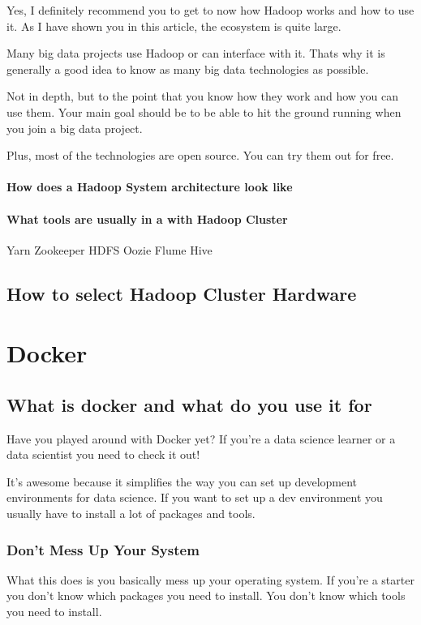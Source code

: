 \documentclass[12pt, numbers=noenddot]{scrreprt} %
\begin{document}
Yes, I definitely recommend you to get to now how Hadoop works and how to use it. As I have shown you in this article, the ecosystem is quite large.

Many big data projects use Hadoop or can interface with it. Thats why it is generally a good idea to know as many big data technologies as possible.

Not in depth, but to the point that you know how they work and how you can use them. Your main goal should be to be able to hit the ground running when you join a big data project.

Plus, most of the technologies are open source. You can try them out for free.
\subsubsection{How does a Hadoop System architecture look like}
\subsubsection{What tools are usually in a with Hadoop Cluster}
Yarn
Zookeeper
HDFS
Oozie
Flume
Hive
\section{How to select Hadoop Cluster Hardware}


\chapter{Docker}

\section{What is docker and what do you use it for}
Have you played around with Docker yet? If you’re a data science learner or a data scientist you need to check it out!

It’s awesome because it simplifies the way you can set up development environments for data science. If you want to set up a dev environment you usually have to install a lot of packages and tools.

\subsection{Don’t Mess Up Your System}

What this does is you basically mess up your operating system. If you’re a starter you don’t know which packages you need to install. You don’t know which tools you need to install.
\end{document}
